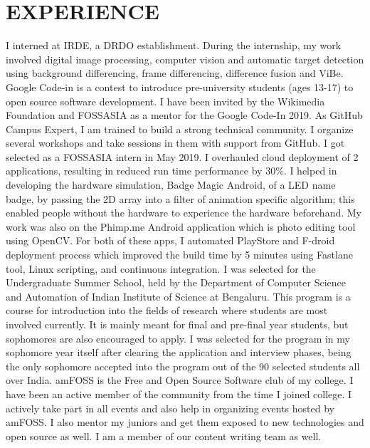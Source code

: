 \documentclass[11pt,a4paper,sans]{moderncv}        %
\begin{document}
\section{EXPERIENCE}
{I interned at IRDE, a DRDO establishment. During the internship, my work involved digital image processing, computer vision and automatic target detection using background differencing, frame differencing, difference fusion and ViBe.}
{Google Code-in is a contest to introduce pre-university students (ages 13-17) to open source software development. I have been invited by the Wikimedia Foundation and FOSSASIA as a mentor for the Google Code-In 2019.}
{As GitHub Campus Expert, I am trained to build a strong technical community. I organize several workshops and take sessions in them with support from GitHub.}
{I got selected as a FOSSASIA intern in  May 2019. I overhauled cloud deployment of 2 applications, resulting in reduced run time performance by 30\%. I helped in developing the hardware simulation, Badge Magic Android, of a LED name badge, by passing the 2D array into a filter of animation specific algorithm; this enabled people without the hardware to experience the hardware beforehand. My work was also on the Phimp.me Android application which is photo editing tool using OpenCV. For both of these apps, I automated PlayStore and F-droid deployment process which improved the build time by 5 minutes using Fastlane tool, Linux scripting, and continuous integration.}{}  %
{I was selected for the Undergraduate Summer School, held by the Department of Computer Science and Automation of Indian Institute of Science at Bengaluru. This program is a course for introduction into the fields of research where students are most involved currently. It is mainly meant for final and pre-final year students, but sophomores are also encouraged to apply. I was selected for the program in my sophomore year itself after clearing the application and interview phases, being the only sophomore accepted into the program out of the 90 selected students all over India.}{}  %
{amFOSS is the Free and Open Source Software club  of my college. I have been an active member of the community from the time I joined college. I actively take part in all events and also help in organizing events hosted by amFOSS. I also mentor my juniors and get them exposed to new technologies and open source as well. I am a member of our content writing team as well.}
\end{document}
